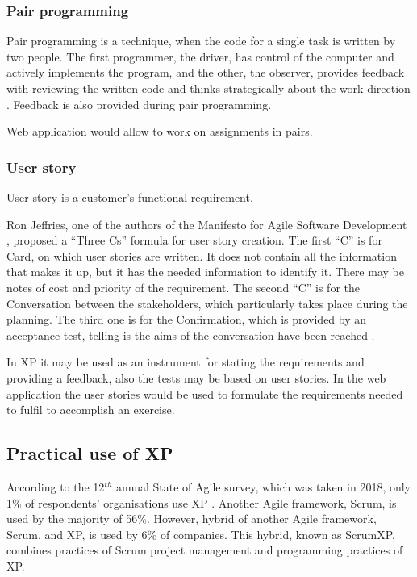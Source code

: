 \subsubsection{Pair programming}

Pair programming is a technique, when the code for a single task is written by two people. The first programmer, the driver, has control of the computer and actively implements the program, and the other, the observer, provides feedback with reviewing the written code and thinks strategically about the work direction \cite{pair_prog}. Feedback is also provided during pair programming. 

Web application would allow to work on assignments in pairs.

\subsubsection{User story}

User story is a customer's functional requirement.

Ron Jeffries, one of the authors of the Manifesto for Agile Software Development \cite{manifesto}, proposed a ``Three Cs'' formula for user story creation. The first ``C'' is for Card, on which user stories are written. It does not contain all the information that makes it up, but it has the needed information to identify it. There may be notes of cost and priority of the requirement. The second ``C'' is for the Conversation between the stakeholders, which particularly takes place during the planning. The third one is for the Confirmation, which is provided by an acceptance test, telling is the aims of the conversation have been reached \cite{rj_3c}.

In XP it may be used as an instrument for stating the requirements and providing a feedback, also the tests may be based on user stories. In the web application the user stories would be used to formulate the requirements needed to fulfil to accomplish an exercise.

\subsection{Practical use of XP}

According to the 12$^{th}$ annual State of Agile survey, which was taken in 2018, only 1\% of respondents' organisations use XP \cite{agile_survey}. Another Agile framework, Scrum, is used by the majority of 56\%. However, hybrid of another Agile framework, Scrum, and XP, is used by 6\% of companies. This hybrid, known as ScrumXP, combines practices of Scrum project management and programming practices of XP.

